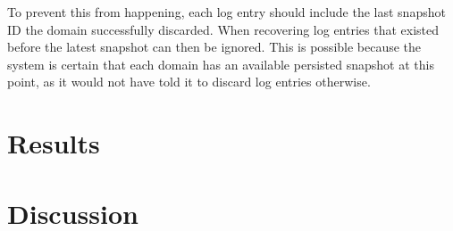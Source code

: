 \documentclass[b5paper]{report}
\begin{document}
To prevent this from happening, each log
entry should include the last snapshot ID the domain successfully discarded.
When recovering log entries that existed before the latest snapshot can then be
ignored. This is possible because the system is certain that each domain has an
available persisted snapshot at this point, as it would not have told it to
discard log entries otherwise.

\chapter{Results}
\chapter{Discussion}



\end{document}
